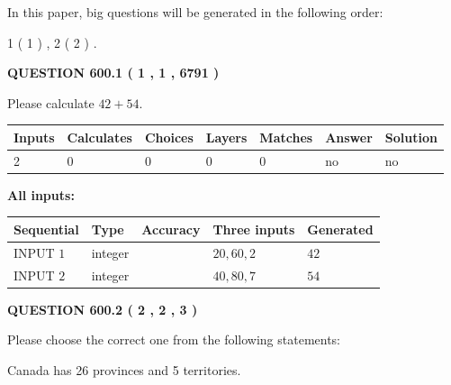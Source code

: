\documentclass[12pt]{article}
\begin{document}
In this paper, big questions will be generated in the following order: 
   
   
   1 ( 1 )
 ,
   2 ( 2 )
 .
  
\vspace{0.2in}
  
{\textbf{\Large{QUESTION
600.1 
 ( 1 , 1 , 6791 )
}}}
  
  
 
Please calculate $ %
42 +  %
54 $.
 
 
   
   
   
   
\noindent\begin{tabular}{|l|l|l|l|l|l|l|}
 \hline
Inputs & Calculates & Choices & Layers & Matches & Answer & Solution \\ \hline
 2  & 
 0  & 
 0
  & 
 0  & 
 0  & 
  no & 
  no 
  \\ \hline
 \end{tabular}
   
   
   
   
\noindent{}
   
   
   
   
\noindent\vspace{0.1in}\hspace{-0.08in} {\textbf{\Large{All inputs: }}}
   
   
  
  
\noindent\begin{tabular}{|l|l|l|l|l|}
\hline
 Sequential & Type & Accuracy & Three inputs & Generated \\ 
\hline
 
 
  INPUT $  1 $ & integer &  & $
 20
 , 
 60
 , 
 2
 $ & $ 42 $ 
 \\  \hline  
 
 
  INPUT $  2 $ & integer &  & $
 40
 , 
 80
 , 
 7
 $ & $ 54 $ 
 \\  \hline  
 \end{tabular}
   
   
  
\vspace{0.2in}
  
{\textbf{\Large{QUESTION
600.2 
 ( 2 , 2 , 3 )
}}}
  
  
Please choose the correct one from the following statements:
 
 
Canada has  26 provinces and  5 territories.
 
\end{document}
